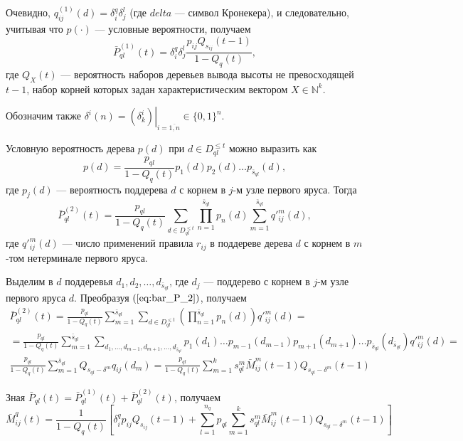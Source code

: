 \documentclass[11pt]{article}
\begin{document}
Очевидно, $q^{(1)}_{ij}(d) = \delta^q_i \delta^l_j$ (где $delta$ --- символ Кронекера), и следовательно, учитывая что $p(\cdot)$ --- условные вероятности, получаем
\begin{equation}
    \bar{P}^{(1)}_{ql}(t) = \delta^q_i \delta^l_j \frac{ p_{ij} Q_{s_{ij}}(t-1) }{ 1 - Q_q(t) },
\end{equation}
где $Q_X(t)$ --- вероятность наборов деревьев вывода высоты не превосходящей $t-1$, набор корней которых задан характеристическим вектором $X \in \mathbb{N}^k$.

Обозначим также $\delta^i(n) = \left. ( \delta^i_k ) \right|_{i = \overline{1,n}} \in \{0,1\}^n$.

Условную вероятность дерева $p(d)$ при $d \in D_{ql}^{\leqslant t}$ можно выразить как
\begin{equation}
    p(d) = \frac{ p_{ql} }{ 1 - Q_q(t) } p_1(d) p_2(d) \ldots p_{\bar{s}_{ql}}(d),
\end{equation}
где $p_j(d)$ --- вероятность поддерева $d$ с корнем в $j$-м узле первого яруса. Тогда
\begin{equation}
\label{eq:bar_P_2}
    \bar{P}^{(2)}_{ql}(t) = \frac{p_{ql}}{1 - Q_q(t)} \sum_{d \in D_{ql}^{\leqslant t}} \prod_{n = 1}^{\bar{s}_{ql}} p_n(d) \sum_{m = 1}^{\bar{s}_{ql}} q'^m_{ij}(d),
\end{equation}
где $q'^m_{ij}(d)$ --- число применений правила $r_{ij}$ в поддереве дерева $d$ с корнем в $m$-том нетерминале первого яруса.

Выделим в $d$ поддеревья $d_1, d_2, \ldots, d_{\bar{s}_{ql}}$, где $d_j$ --- поддерево с корнем в $j$-м узле первого яруса $d$. Преобразуя $(\ref{eq:bar_P_2})$, получаем
\begin{multline}
    \bar{P}^{(2)}_{ql}(t) = \frac{p_{ql}}{1 - Q_q(t)} \sum_{m = 1}^{\bar{s}_{ql}} \sum_{d \in D_{ql}^{\leqslant t}} \left( \prod_{n = 1}^{\bar{s}_{ql}} p_n(d) \right) q'^m_{ij}(d) = \\
    = \frac{p_{ql}}{1 - Q_q(t)} \sum_{m = 1}^{\bar{s}_{ql}} \sum_{ d_1, \ldots, d_{m-1}, d_{m+1}, \ldots, d_{\bar{s}_{ql}} } p_1(d_1) \ldots p_{m-1}(d_{m-1}) p_{m+1}(d_{m+1}) \ldots p_{\bar{s}_{ql}}(d_{\bar{s}_{ql}}) q'^m_{ij}(d) = \\
    \frac{p_{ql}}{1 - Q_q(t)} \sum_{m = 1}^{\bar{s}_{ql}} Q_{s_{ql} - \delta^m} q_{ij}(d_m) = \frac{p_{ql}}{1 - Q_q(t)} \sum_{m = 1}^k s_{ql}^m \bar{M}^m_{ij}(t-1) Q_{s_{ql} - \delta^m}(t-1)
\end{multline}

Зная $\bar{P}_{ql}(t) = \bar{P}^{(1)}_{ql}(t) + \bar{P}^{(2)}_{ql}(t)$, получаем
\begin{equation}
    \bar{M}^q_{ij}(t) = \frac{1}{1 - Q_q(t)} \left[ \delta^q_i p_{ij} Q_{s_{ij}}(t-1) + \sum_{l = 1}^{n_q} p_{ql} \sum_{m = 1}^k s_{ql}^m \bar{M}^m_{ij}(t-1) Q_{s_{ql} - \delta^m}(t-1) \right]
\end{equation}
\end{document}
